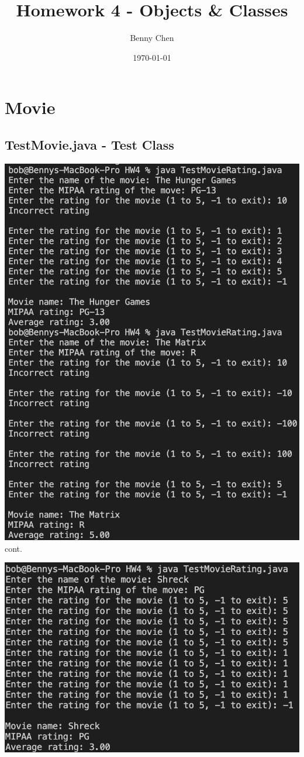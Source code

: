 \documentclass{article}
\title{Homework 4 - Objects \& Classes}
\author{Benny Chen}
\date{\today}
\begin{document}
\maketitle

\section{Movie}

\subsection*{TestMovie.java - Test Class}

\begin{center}
    \includegraphics[scale = .65]{test1-2.png}
    \\cont.
\end{center}

\begin{center}
    \includegraphics[scale = .65]{test3.png}
\end{center}
\end{document}
